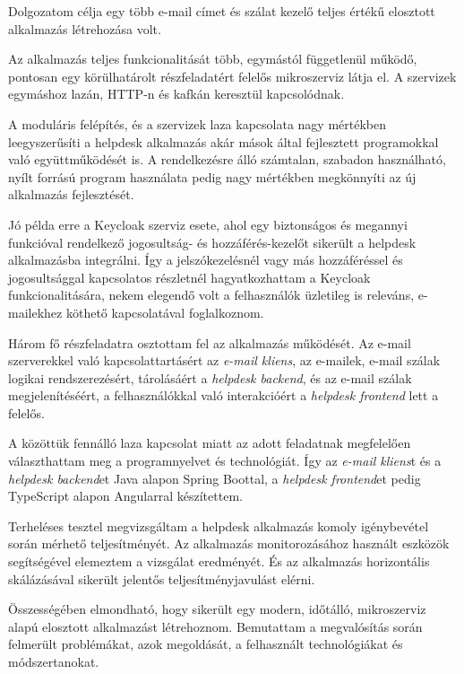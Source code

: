 Dolgozatom célja egy több e-mail címet és szálat kezelő teljes értékű elosztott alkalmazás létrehozása volt.

\bigskip
Az alkalmazás teljes funkcionalitását több, egymástól függetlenül működő, pontosan egy körülhatárolt részfeladatért felelős mikroszerviz látja el. A szervizek egymáshoz lazán, HTTP-n és kafkán keresztül kapcsolódnak.

A moduláris felépítés, és a szervizek laza kapcsolata nagy mértékben leegyszerűsíti a helpdesk alkalmazás akár mások által fejlesztett programokkal való együttműködését is. A rendelkezésre álló számtalan, szabadon használható, nyílt forrású program használata pedig nagy mértékben megkönnyíti az új alkalmazás fejlesztését.

Jó példa erre a Keycloak szerviz esete, ahol egy biztonságos és megannyi funkcióval rendelkező jogosultság- és hozzáférés-kezelőt sikerült a helpdesk alkalmazásba integrálni. Így a jelszókezelésnél vagy más hozzáféréssel és jogosultsággal kapcsolatos részletnél hagyatkozhattam a Keycloak funkcionalitására, nekem elegendő volt a felhasználók üzletileg is releváns, e-mailekhez köthető kapcsolatával foglalkoznom.

\bigskip
Három fő részfeladatra osztottam fel az alkalmazás működését. Az e-mail szerverekkel való kapcsolattartásért az \textit{e-mail kliens}, az e-mailek, e-mail szálak logikai rendszerezésért, tárolásáért a \textit{helpdesk backend}, és az e-mail szálak megjelenítéséért, a felhasználókkal való interakcióért a \textit{helpdesk frontend} lett a felelős.

A közöttük fennálló laza kapcsolat miatt az adott feladatnak megfelelően választhattam meg a programnyelvet és technológiát. Így az \textit{e-mail kliens}t és a \textit{helpdesk backend}et Java alapon Spring Boottal, a \textit{helpdesk frontend}et pedig TypeScript alapon Angularral készítettem.


\bigskip
Terheléses tesztel megvizsgáltam a helpdesk alkalmazás komoly igénybevétel során mérhető teljesítményét. Az alkalmazás monitorozásához használt eszközök segítségével elemeztem a vizsgálat eredményét. És az alkalmazás horizontális skálázásával sikerült jelentős teljesítményjavulást elérni.

\pagebreak
Összességében elmondható, hogy sikerült egy modern, időtálló, mikroszerviz alapú elosztott alkalmazást létrehoznom. Bemutattam a megvalósítás során felmerült problémákat, azok megoldását, a felhasznált technológiákat és módszertanokat.
